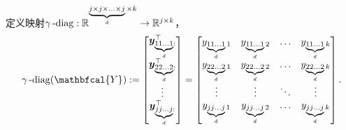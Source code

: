 \begin{definition}[$d+1$阶张量“对角”元素]\kaishu
	定义映射$\gamma\operatorname{-diag}:\mathbb{R}^{\underbrace{\scriptstyle{j\times j\times \ldots \times j}}_{d}\times k}\rightarrow\mathbb{R}^{j\times k}$，
	\begin{equation*}
	\begin{aligned}
		\mydiag(\mathbfcal{Y})
	    :=\begin{bmatrix}\boldsymbol{y}_{\underbrace{\scriptstyle{11\ldots 1}}_{d}:}^{\top}\\\boldsymbol{y}_{\underbrace{\scriptstyle{22\ldots 2}}_{d}:}^{\top}\\\vdots\\\boldsymbol{y}_{\underbrace{\scriptstyle{jj\ldots j}}_{d}:}^{\top}\end{bmatrix}
		=\begin{bmatrix}y_{\underbrace{\scriptstyle{11\ldots 1}}_{d} 1}&y_{\underbrace{\scriptstyle{11\ldots 1}}_{d} 2}&\ldots&y_{\underbrace{\scriptstyle{11\ldots 1}}_{d} k}\\y_{\underbrace{\scriptstyle{22\ldots 2}}_{d} 1}&y_{\underbrace{\scriptstyle{22\ldots 2}}_{d} 2}&\ldots&y_{\underbrace{\scriptstyle{22\ldots 2}}_{d} k}\\\vdots&\vdots&\ddots&\vdots\\y_{\underbrace{\scriptstyle{jj\ldots j}}_{d} 1}&y_{\underbrace{\scriptstyle{jj\ldots j}}_{d} 2}&\ldots&y_{\underbrace{\scriptstyle{jj\ldots j}}_{d} k}\end{bmatrix}.
	\end{aligned}
	\end{equation*}
\end{definition}


